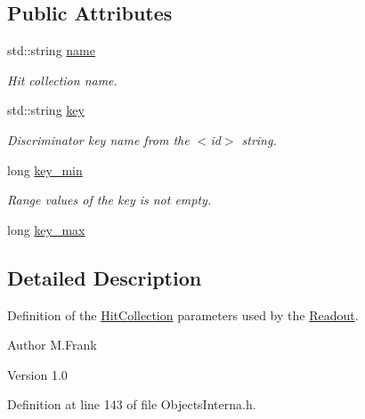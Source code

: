\subsection*{Public Attributes}
\begin{DoxyCompactItemize}
\item 
std::string \hyperlink{class_d_d4hep_1_1_geometry_1_1_hit_collection_a9c9a772a612f38f6104fd976f8b20ba0}{name}
\begin{DoxyCompactList}\small\item\em Hit collection name. \item\end{DoxyCompactList}\item 
std::string \hyperlink{class_d_d4hep_1_1_geometry_1_1_hit_collection_a4948f37ecd677f966101a2d662412790}{key}
\begin{DoxyCompactList}\small\item\em Discriminator key name from the $<$id$>$ string. \item\end{DoxyCompactList}\item 
long \hyperlink{class_d_d4hep_1_1_geometry_1_1_hit_collection_a34a3fcd70ef34e2b1ecb877805a0f682}{key\_\-min}
\begin{DoxyCompactList}\small\item\em Range values of the key is not empty. \item\end{DoxyCompactList}\item 
long \hyperlink{class_d_d4hep_1_1_geometry_1_1_hit_collection_af307fe48c5092b585933c02e837f177d}{key\_\-max}
\end{DoxyCompactItemize}


\subsection{Detailed Description}
Definition of the \hyperlink{class_d_d4hep_1_1_geometry_1_1_hit_collection}{HitCollection} parameters used by the \hyperlink{class_d_d4hep_1_1_geometry_1_1_readout}{Readout}. \begin{DoxyAuthor}{Author}
M.Frank 
\end{DoxyAuthor}
\begin{DoxyVersion}{Version}
1.0 
\end{DoxyVersion}


Definition at line 143 of file ObjectsInterna.h.

